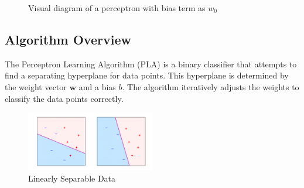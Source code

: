 \begin{figure}[H]
\begin{center}
\end{center}

    \caption{Visual diagram of a perceptron with bias term as $w_0$}
    \label{fig:perceptron}
\end{figure}

\subsection{Algorithm Overview} \label{def:PLA}
The Perceptron Learning Algorithm (PLA) is a binary classifier that attempts to find a separating hyperplane for data points. This hyperplane is determined by the weight vector \( \mathbf{w} \) and a bias \( b \). The algorithm iteratively adjusts the weights to classify the data points correctly.

\begin{figure}[H]
    \centering
    \includegraphics[width=0.5\textwidth]{img/pla-plot.png}
    \caption{Linearly Separable Data}
    \label{fig:pla-plot}
\end{figure}

